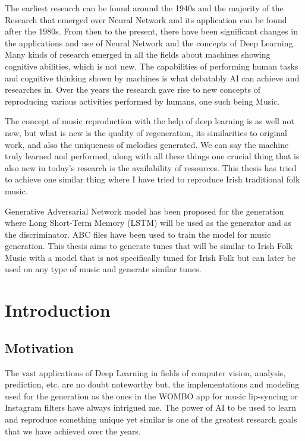 \documentclass[oneside,12pt]{Classes/RoboticsLaTeX}
\begin{document}
\begin{abstracts}

The earliest research can be found around the 1940s and the majority of the Research that emerged over Neural Network and its application can be found after the 1980s. From then to the present, there have been significant changes in the applications and use of Neural Network and the concepts of Deep Learning. Many kinds of research emerged in all the fields about machines showing cognitive abilities, which is not new. The capabilities of performing human tasks and cognitive thinking shown by machines is what debatably AI can achieve and researches in. Over the years the research gave rise to new concepts of reproducing various activities performed by humans, one such being Music.

The concept of music reproduction with the help of deep learning is as well not new, but what is new is the quality of regeneration, its similarities to original work, and also the uniqueness of melodies generated. We can say the machine truly learned and performed, along with all these things one crucial thing that is also new in today's research is the availability of resources. This thesis has tried to achieve one similar thing where I have tried to reproduce Irish traditional folk music.

Generative Adversarial Network model has been proposed for the generation where Long Short-Term Memory (LSTM) will be used as the generator and as the discriminator. ABC files have been used to train the model for music generation. This thesis aims to generate tunes that will be similar to Irish Folk Music with a model that is not specifically tuned for Irish Folk but can later be used on any type of music and generate similar tunes.

\end{abstracts}


\tableofcontents
\listoffigures

\mainmatter

\chapter{Introduction}
\label{chap:introduction}
\section{Motivation}

The vast applications of Deep Learning in fields of computer vision, analysis, prediction, etc. are no doubt noteworthy but, the implementations and modeling used for the generation as the ones in the WOMBO app for music lip-syncing or Instagram filters have always intrigued me. The power of AI to be used to learn and reproduce something unique yet similar is one of the greatest research goals that we have achieved over the years.
\end{document}
